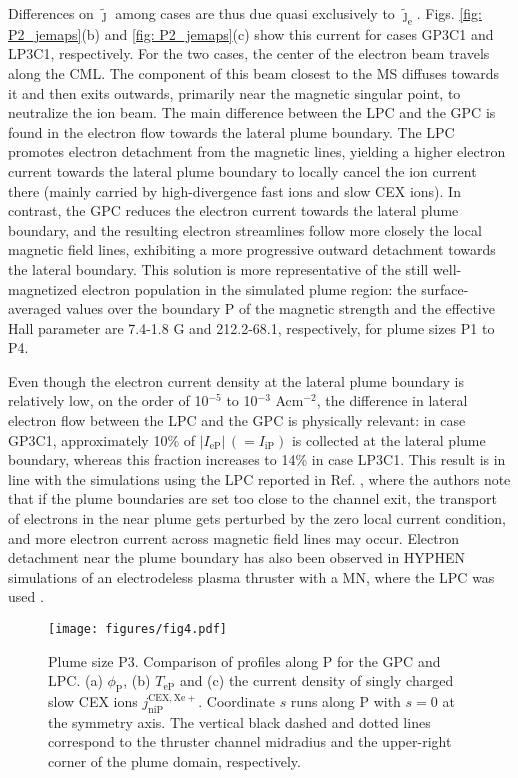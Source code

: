 \documentclass[%
 aip,
cha,
 amsmath,amssymb,
 reprint,%
]{revtex4-1}
\begin{document}
Differences on $\tilde{\bm\jmath}$ among cases are thus due quasi exclusively to $\tilde{\bm\jmath}_\mathrm{e}$. Figs. \ref{fig: P2_jemaps}(b) and \ref{fig: P2_jemaps}(c) show this current for cases GP3C1 and LP3C1, respectively.
%
For the two cases, the center of the electron beam travels along the CML. The component of this beam closest to the MS diffuses towards it and then exits outwards, primarily near the magnetic singular point, to neutralize the ion beam.
%
The main difference between the LPC and the GPC is found in the electron flow towards the lateral plume boundary.
%
The LPC promotes electron detachment from the magnetic lines, yielding a higher electron current towards the lateral plume boundary to locally cancel the ion current there (mainly carried by high-divergence fast ions and slow CEX ions). 
In contrast, the GPC reduces the electron current towards the lateral plume boundary, and the resulting electron streamlines follow more closely the local magnetic field lines, exhibiting a more progressive outward detachment towards the lateral boundary.
%
This solution is more representative of the still well-magnetized electron population in the simulated plume region: the surface-averaged values over the boundary P of the magnetic strength and the effective Hall parameter
are 7.4-1.8 G and 212.2-68.1, respectively, for plume sizes P1 to P4. 


Even though the electron current density at the lateral plume boundary is relatively low, on the order of 10$^{-5}$ to 10$^{-3}$ Acm$^{-2}$, the difference in lateral electron flow between the LPC and the GPC is physically relevant: in case GP3C1, approximately 10\% of $|I_\mathrm{eP}| \, (= I_\mathrm{iP})$ is collected at the lateral plume boundary, whereas this fraction increases to 14\% in case LP3C1. 
%
This result is in line with the simulations using the LPC reported in Ref. , where the authors note that if the plume boundaries are set too close to the channel exit, the transport of electrons in the near plume gets perturbed by the zero local current condition, and more electron current across magnetic field lines may occur.
%
Electron detachment near the plume boundary has also been observed in HYPHEN simulations of an electrodeless plasma thruster with a MN, where the LPC was used \cite{zhou22a}.




\begin{figure}[!t]
\centering
\texttt{[image: figures/fig4.pdf]}
\caption{
Plume size P3. Comparison of profiles along P for the GPC and LPC. (a) $\phi_\mathrm{P}$, (b) $T_\mathrm{eP}$ and (c) the current density of singly charged slow CEX ions $j_\mathrm{niP}^\mathrm{CEX, Xe+}$. Coordinate $s$ runs along P with $s = 0$ at the symmetry axis. The vertical black dashed and dotted lines correspond to the thruster channel midradius and the upper-right corner of the plume domain, respectively.}
\label{fig: P2_down_1}
\end{figure}
\end{document}
